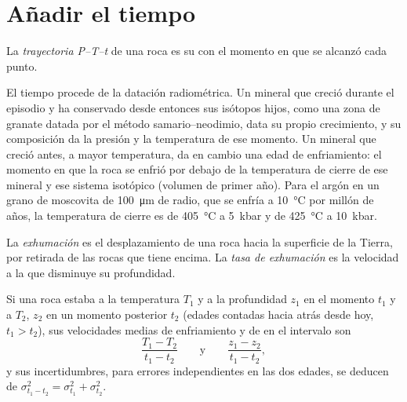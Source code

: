 \section{Añadir el tiempo}\label{sec:b2:pt-paths:time}

\begin{definition}[Trayectoria P--T--t]\label{def:b2:pt-paths:ptt}
La \emph{trayectoria P--T--t} de una roca es su  con el momento en
que se alcanzó cada punto.
\end{definition}

El tiempo procede de la datación radiométrica. Un mineral que creció durante el episodio y ha conservado
desde entonces sus isótopos hijos, como una zona de granate datada por el
método samario--neodimio, data su propio crecimiento, y su
composición da la presión y la temperatura de ese momento. Un mineral que creció
antes, a mayor temperatura, da en cambio una edad de enfriamiento: el momento en que la roca
se enfrió por debajo de la temperatura de cierre de ese mineral y ese sistema isotópico (volumen de primer
año). Para el argón en un grano de moscovita de \qty{100}{\micro m} de radio, que se enfría a
\qty{10}{\celsius} por millón de años, la temperatura de cierre es de \qty{405}{\celsius} a
\qty{5}{kbar} y de \qty{425}{\celsius} a \qty{10}{kbar}.

\begin{definition}\label{def:b2:pt-paths:exhumation}
La \emph{exhumación} es el desplazamiento de una roca hacia la superficie de la Tierra,
por retirada de las rocas que tiene encima. La \emph{tasa de exhumación} es la
velocidad a la que disminuye su profundidad.
\end{definition}

\begin{proposition}\label{prop:b2:pt-paths:rates}
Si una roca estaba a la temperatura $T_1$ y a la profundidad $z_1$ en el momento $t_1$ y a $T_2$, $z_2$ en un
momento posterior $t_2$ (edades contadas hacia atrás desde hoy, $t_1 > t_2$), sus velocidades medias de enfriamiento y
de  en el intervalo son
\[
\frac{T_1 - T_2}{t_1 - t_2}
\qquad\text{y}\qquad
\frac{z_1 - z_2}{t_1 - t_2},
\]
y sus incertidumbres, para errores independientes en las dos edades, se deducen de
$\sigma_{t_1 - t_2}^2 = \sigma_{t_1}^2 + \sigma_{t_2}^2$.
\end{proposition}


